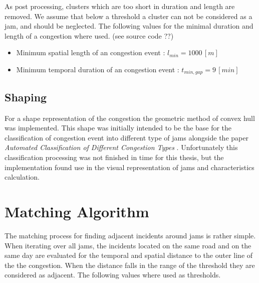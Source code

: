 As post processing, clusters which are too short in duration and length are removed. We assume that below a threshold a cluster can not be considered as a jam, and should be neglected. The following values for the minimal duration and length of a congestion where used. (see source code ??)

\begin{itemize}
	\item Minimum spatial length of an congestion event : $l_{min} = 1000 \, [m]$
	\item Minimum temporal duration of an congestion event : $t_{min,gap} = 9 \, [min]$
\end{itemize}

\subsection{Shaping}
\label{methodology_detection_shaping}
For a shape representation of the congestion the geometric method of convex hull was implemented. This shape was initially intended to be the base for the classification of congestion event into different type of jams alongside the paper \textit{Automated Classification of Different Congestion Types} \parencite{Kessler2020}. Unfortunately this classification processing was not finished in time for this thesis, but the implementation found use in the visual representation of jams and characteristics calculation.


\section{Matching Algorithm}
\label{methodology_matching}
The matching process for finding adjacent incidents around jams is rather simple. When iterating over all jams, the incidents located on the same road and on the same day are evaluated for the temporal and spatial distance to the outer line of the the congestion. When the distance falls in the range of the threshold they are considered as adjacent. The following values where used as thresholds.

